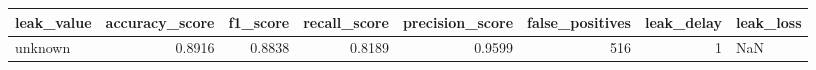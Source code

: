 \begin{tabular}{lrrrrrrl}
\toprule
leak\_value & accuracy\_score & f1\_score & recall\_score & precision\_score & false\_positives & leak\_delay & leak\_loss \\
\midrule
unknown & 0.8916 & 0.8838 & 0.8189 & 0.9599 & 516 & 1 & NaN \\
\bottomrule
\end{tabular}
